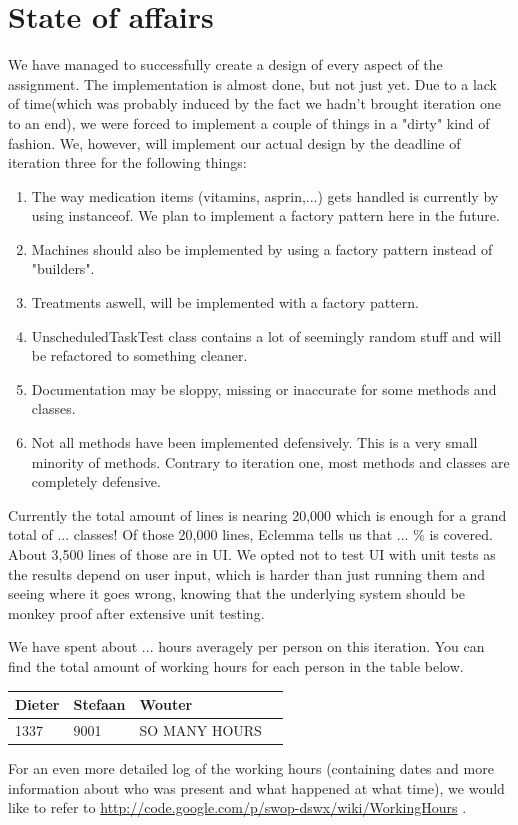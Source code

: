 \documentclass[11pt]{article}
\begin{document}
\section{State of affairs}
We have managed to successfully create a design of every aspect of the assignment. The implementation is almost done, but not just yet. Due to a lack of time(which was probably induced by the fact we hadn't brought iteration one to an end), we were forced to implement a couple of things in a "dirty" kind of fashion. We, however, will implement our actual design by the deadline of iteration three for the following things:
\begin{enumerate}
\item{The way medication items (vitamins, asprin,...) gets handled is currently by using instanceof. We plan to implement a factory pattern here in the future.}
\item{Machines should also be implemented by using a factory pattern instead of "builders".}
\item{Treatments aswell, will be implemented with a factory pattern.}
\item{UnscheduledTaskTest class contains a lot of seemingly random stuff and will be refactored to something cleaner.}
\item{Documentation may be sloppy, missing or inaccurate for some methods and classes.}
\item{Not all methods have been implemented defensively. This is a very small minority of methods. Contrary to iteration one, most methods and classes are completely defensive.}
\end{enumerate}


Currently the total amount of lines is nearing 20,000 which is enough for a grand total of ... classes! Of those 20,000 lines, Eclemma tells us that ... \% is covered. About 3,500 lines of those are in UI. We opted not to test UI with unit tests as the results depend on user input, which is harder than just running them and seeing where it goes wrong, knowing that the underlying system should be monkey proof after extensive unit testing.

We have spent about ... hours averagely per person on this iteration. You can find the total amount of working hours for each person in the table below.
\begin{center}
    \begin{tabular}{ | l | l | l | p{10cm} |}
    \hline
    Dieter & Stefaan & Wouter\\ \hline
    1337 & 9001 & SO MANY HOURS\\
    \hline
    \end{tabular}
\end{center}
For an even more detailed log of the working hours (containing dates and more information about who was present and what happened at what time), we would like to refer to \url{http://code.google.com/p/swop-dswx/wiki/WorkingHours} .
\end{document}
